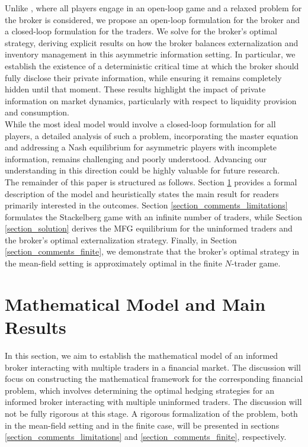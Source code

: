 \documentclass[10pt]{article}
\begin{document}
Unlike \citeauthor{bergault2024mfg} \cite{bergault2024mfg}, where all players engage in an open-loop game and a relaxed problem for the broker is considered, we propose an open-loop formulation for the broker and a closed-loop formulation for the traders. We solve for the broker’s optimal strategy, deriving explicit results on how the broker balances externalization and inventory management in this asymmetric information setting. In particular, we establish the existence of a deterministic critical time at which the broker should fully disclose their private information, while ensuring it remains completely hidden until that moment. These results highlight the impact of private information on market dynamics, particularly with respect to liquidity provision and consumption.\\

While the most ideal model would involve a closed-loop formulation for all players, a detailed analysis of such a problem, incorporating the master equation and addressing a Nash equilibrium for asymmetric players with incomplete information, remains challenging and poorly understood. Advancing our understanding in this direction could be highly valuable for future research.\\

The remainder of this paper is structured as follows. Section \ref{model_setting_and_main_conclusion} provides a formal description of the model and heuristically states the main result for readers primarily interested in the outcomes. Section \ref{section_comments_limitations} formulates the Stackelberg game with an infinite number of traders, while Section \ref{section_solution} derives the MFG equilibrium for the uninformed traders and the broker's optimal externalization strategy. Finally, in Section \ref{section_comments_finite}, we demonstrate that the broker's optimal strategy in the mean-field setting is approximately optimal in the finite \( N \)-trader game. 


\section{Mathematical Model and Main Results}\label{model_setting_and_main_conclusion}

In this section, we aim to establish the mathematical model of an informed broker interacting with multiple traders in a financial market. The discussion will focus on constructing the mathematical framework for the corresponding financial problem, which involves determining the optimal hedging strategies for an informed broker interacting with multiple uninformed traders. The discussion will not be fully rigorous at this stage. A rigorous formalization of the problem, both in the mean-field setting and in the finite case, will be presented in sections \ref{section_comments_limitations} and \ref{section_comments_finite}, respectively.
\end{document}
